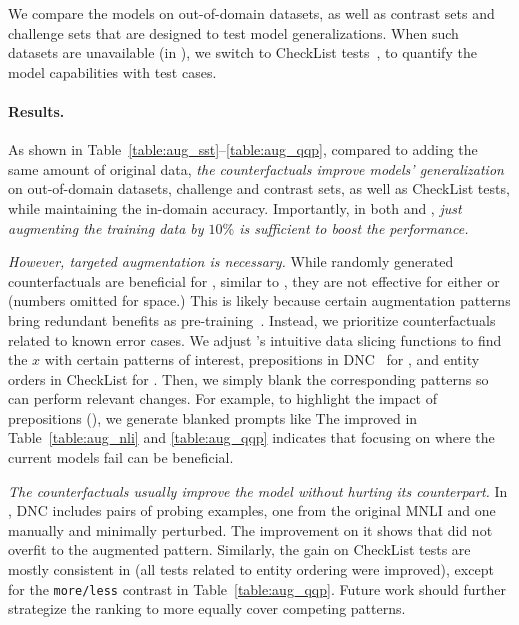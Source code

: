We compare the models on out-of-domain datasets, as well as contrast sets and challenge sets that are designed to test model generalizations.
When such datasets are unavailable (in \qqp), we switch to CheckList tests~\cite{checklist:acl20}, to quantify the model capabilities with test cases.

\paragraph{Results.}
As shown in Table~\ref{table:aug_sst}--\ref{table:aug_qqp}, compared to adding the same amount of original data, \emph{the counterfactuals improve models' generalization} on out-of-domain datasets, challenge and contrast sets, as well as CheckList tests, while maintaining the in-domain accuracy.
Importantly, in both \nli and \qqp, \emph{just augmenting the training data by $10\%$ is sufficient to boost the performance.}


\TableAugQQP


\emph{However, targeted augmentation is necessary.}
While randomly generated counterfactuals are beneficial for \sst, similar to \citet{huang2020counterfactually}, they are not effective for either \nli or \qqp (numbers omitted for space.)
This is likely because certain augmentation patterns bring redundant benefits as pre-training~\cite{longpre2020effective}.
Instead, we prioritize counterfactuals related to known error cases.
We adjust \citet{chen2019slice}'s intuitive data slicing functions to find the $x$ with certain patterns of interest, \eg prepositions in DNC~\cite{kim2019probing} for \nli, and entity orders in CheckList for \qqp.
Then, we simply blank the corresponding patterns so \sysname can perform relevant changes.
For example, to highlight the impact of prepositions (), we %
generate blanked prompts like 
The improved \maug in Table~\ref{table:aug_nli} and \ref{table:aug_qqp} indicates that focusing on where the current models fail can be beneficial.

\emph{The counterfactuals usually improve the model without hurting its counterpart.}
In \nli, DNC includes pairs of probing examples, one from the original MNLI and one manually and minimally perturbed.
The improvement on it shows that \maug did not overfit to the augmented pattern.
Similarly, the gain on CheckList tests are mostly consistent in \qqp (\eg all tests related to entity ordering were improved), except for the \texttt{more/less} contrast in Table~\ref{table:aug_qqp}.
Future work should further strategize the ranking to more equally cover competing patterns. 


